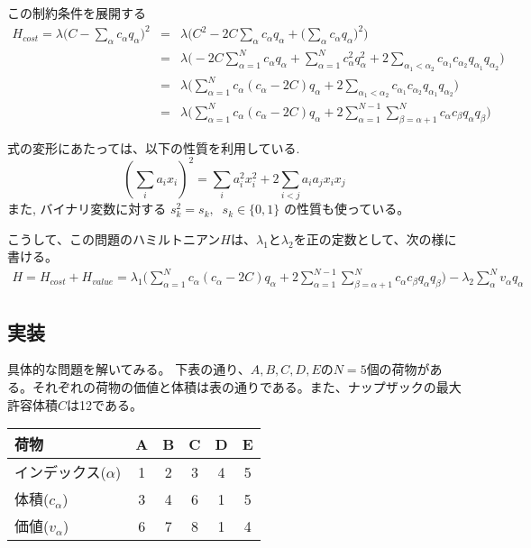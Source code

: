 \documentclass[uplatex,dvipdfmx,a4paper,11pt,oneside,openany]{jsbook}
\begin{document}
この制約条件を展開する
\begin{eqnarray*}
  H_{cost} = \lambda\bigg(C - \sum_\alpha c_\alpha q_\alpha\bigg)^2
  &=&\lambda\bigg(C^2 - 2C\sum_\alpha c_\alpha q_\alpha + \bigg(\sum_\alpha c_\alpha q_\alpha\bigg)^2\bigg)\\
  &=&\lambda\bigg(-2C\sum_{\alpha=1}^Nc_\alpha q_\alpha + \sum_{\alpha=1}^Nc_\alpha^2 q_\alpha^2 + 2\sum_{\alpha_1<\alpha_2}c_{\alpha_1}c_{\alpha_2}q_{\alpha_1}q_{\alpha_2}\bigg)\\
  &=&\lambda\bigg(\sum_{\alpha=1}^Nc_\alpha(c_\alpha-2C)q_\alpha + 2\sum_{\alpha_1<\alpha_2}c_{\alpha_1}c_{\alpha_2}q_{\alpha_1}q_{\alpha_2}\bigg)\\
&=&\lambda\bigg(\sum_{\alpha=1}^Nc_\alpha(c_\alpha-2C)q_\alpha+2\sum_{\alpha=1}^{N-1}\sum_{\beta=\alpha+1}^Nc_\alpha c_\beta q_\alpha q_\beta\bigg)
\end{eqnarray*}

\begin{screen}
式の変形にあたっては、以下の性質を利用している.
\[
\left(\sum_i a_i x_i\right)^2=\sum_i a_i^2 x_i^2 + 2\sum_{i<j}a_i a_j x_i x_j
\]
また, バイナリ変数に対する $s_k^2=s_k,\;\; s_k \in \{0, 1\}$ の性質も使っている。
\end{screen}

こうして、この問題のハミルトニアン$H$は、$\lambda_1$と$\lambda_2$を正の定数として、次の様に書ける。
\begin{eqnarray*}
  H = H_{cost} + H_{value} = \lambda_1\bigg(\sum_{\alpha=1}^Nc_\alpha(c_\alpha-2C)q_\alpha+2\sum_{\alpha=1}^{N-1}\sum_{\beta=\alpha+1}^Nc_\alpha c_\beta q_\alpha q_\beta\bigg) - \lambda_2\sum_\alpha^Nv_\alpha q_\alpha
\end{eqnarray*}

\subsection{実装}

具体的な問題を解いてみる。
下表の通り、$A,B,C,D,E$の$N=5$個の荷物がある。それぞれの荷物の価値と体積は表の通りである。また、ナップザックの最大許容体積$C$は12である。\\

\begin{tabular}{|l|ccccc|}\hline
  荷物 & A & B & C & D & E \\\hline
  インデックス($\alpha$) & 1 & 2 & 3 & 4 & 5 \\\hline
  体積($c_\alpha$) & 3 & 4 & 6 & 1 & 5 \\\hline
  価値($v_\alpha$) & 6 & 7 & 8 & 1 & 4 \\\hline
\end{tabular}\\
\end{document}
